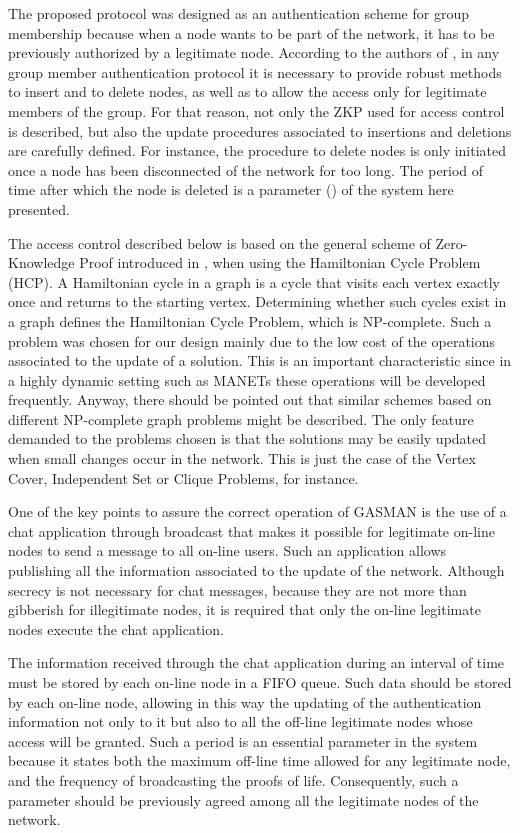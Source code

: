 \documentclass[conference]{IEEEtran}
\begin{document}
\label{BasicsandNotation}


The proposed protocol was designed as an authentication scheme for
group membership because when a node wants to be part of the
network, it has to be previously authorized by a legitimate node.
According to the authors of \cite{MAH00}, in any group member
authentication protocol it is necessary to provide robust methods
to insert and to delete nodes, as well as to allow the access only
for legitimate members of the group. For that reason, not only the
ZKP used for access control is described, but also the
update procedures associated to insertions and deletions are
carefully defined. For instance, the procedure to delete nodes is only initiated once a node has been
disconnected of the network for too long. The period of time after which the node is deleted is a parameter () of the system here presented.

The access control described below is based on the general scheme
of Zero-Knowledge Proof introduced in \cite{CH01}, when using the
Hamiltonian Cycle Problem (HCP). A Hamiltonian cycle in a graph is
a cycle that visits each vertex exactly once and returns to the
starting vertex. Determining whether such cycles exist in a graph
defines the Hamiltonian Cycle Problem, which is NP-complete. Such
a problem was chosen for our design mainly due to the low cost of
the operations associated to the update of a solution. This is an
important characteristic since in a highly dynamic setting such as
MANETs these operations will be developed frequently. Anyway,
there should be pointed out that similar schemes based on
different NP-complete graph problems might be described. The only
feature demanded to the problems chosen is that the solutions may
be easily updated when small changes occur in the network. This is
just the case of the Vertex Cover, Independent Set or Clique
Problems, for instance.

One of the key points to assure the correct operation of GASMAN is the use of a chat application through broadcast that
makes it possible for legitimate on-line nodes to send a message
to all on-line users. Such an application allows
publishing all the information associated to the update of the
network. Although secrecy is not necessary for chat messages, because they are not more than gibberish for illegitimate nodes, it is required that only the on-line legitimate nodes execute the chat application.

The information received through the chat application during an
interval of time must be stored by each on-line node in a FIFO
queue. Such data should be stored by each on-line node, allowing in this way the updating of
the authentication information not only to it but also to all the
off-line legitimate nodes whose access will be granted. Such a period is an essential
parameter in the system because it states both the maximum off-line time allowed
for any legitimate node, and the frequency of broadcasting the proofs
of life. Consequently, such a parameter should be previously
agreed among all the legitimate nodes of the network.
\end{document}

